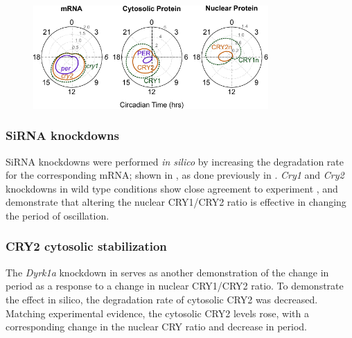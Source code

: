 \begin{figure}[bt]
  \centering
  \includegraphics[width=0.8\textwidth]{chap2/figures/timecourse.pdf}
  \label{fig:timecourse}
\end{figure}

\subsubsection{SiRNA knockdowns}
SiRNA knockdowns were performed {\it in silico} by increasing the degradation rate for the corresponding mRNA; shown in , as done previously in \cite{Relogio2011}. 
{\it Cry1} and {\it Cry2} knockdowns in wild type conditions show close agreement to experiment \cite{Zhang2009}, and demonstrate that altering the nuclear CRY1/CRY2 ratio is effective in changing the period of oscillation.

\subsubsection{CRY2 cytosolic stabilization}
The {\it Dyrk1a} knockdown in \cite{Kurabayashi2010} serves as another demonstration of the change in period as a response to a change in nuclear CRY1/CRY2 ratio. 
To demonstrate the effect in silico, the degradation rate of cytosolic CRY2 was decreased. 
Matching experimental evidence, the cytosolic CRY2 levels rose, with a corresponding change in the nuclear CRY ratio and decrease in period.

